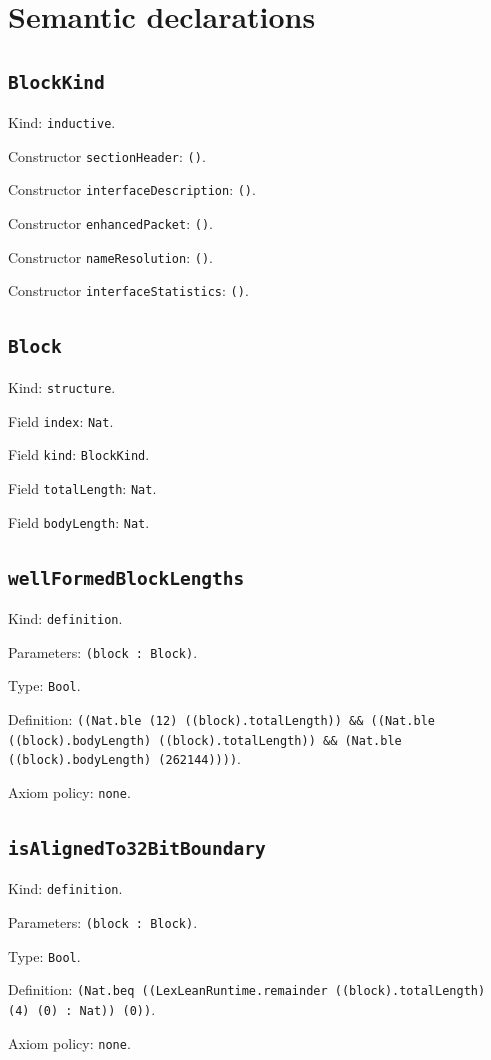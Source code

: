 \documentclass[11pt]{article}
\begin{document}
\section*{Semantic declarations}
\subsection*{\texttt{BlockKind}}
\noindent Kind: \texttt{inductive}.\par
\noindent Constructor \texttt{sectionHeader}: \texttt{()}.\par
\noindent Constructor \texttt{interfaceDescription}: \texttt{()}.\par
\noindent Constructor \texttt{enhancedPacket}: \texttt{()}.\par
\noindent Constructor \texttt{nameResolution}: \texttt{()}.\par
\noindent Constructor \texttt{interfaceStatistics}: \texttt{()}.\par
\subsection*{\texttt{Block}}
\noindent Kind: \texttt{structure}.\par
\noindent Field \texttt{index}: \texttt{Nat}.\par
\noindent Field \texttt{kind}: \texttt{BlockKind}.\par
\noindent Field \texttt{totalLength}: \texttt{Nat}.\par
\noindent Field \texttt{bodyLength}: \texttt{Nat}.\par
\subsection*{\texttt{wellFormedBlockLengths}}
\noindent Kind: \texttt{definition}.\par
\noindent Parameters: \texttt{(block : Block)}.\par
\noindent Type: \texttt{Bool}.\par
\noindent Definition: \texttt{((Nat.ble (12) ((block).totalLength)) \&\& ((Nat.ble ((block).bodyLength) ((block).totalLength)) \&\& (Nat.ble ((block).bodyLength) (262144))))}.\par
\noindent Axiom policy: \texttt{none}.\par
\subsection*{\texttt{isAlignedTo32BitBoundary}}
\noindent Kind: \texttt{definition}.\par
\noindent Parameters: \texttt{(block : Block)}.\par
\noindent Type: \texttt{Bool}.\par
\noindent Definition: \texttt{(Nat.beq ((LexLeanRuntime.remainder ((block).totalLength) (4) (0) : Nat)) (0))}.\par
\noindent Axiom policy: \texttt{none}.\par
\end{document}
